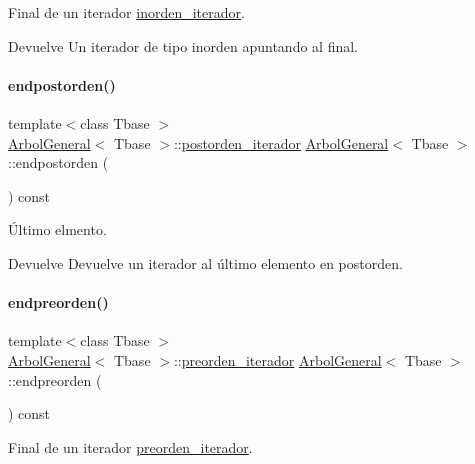 Final de un iterador \hyperlink{classArbolGeneral_1_1inorden__iterador}{inorden\+\_\+iterador}. 

\begin{DoxyReturn}{Devuelve}
Un iterador de tipo inorden apuntando al final. 
\end{DoxyReturn}
\hypertarget{classArbolGeneral_a7f63c88d6c944709d05bb753351c4be5}{}\label{classArbolGeneral_a7f63c88d6c944709d05bb753351c4be5} 
\paragraph{\texorpdfstring{endpostorden()}{endpostorden()}}
{\footnotesize\ttfamily template$<$class Tbase $>$ \\
\hyperlink{classArbolGeneral}{Arbol\+General}$<$ Tbase $>$\+::\hyperlink{classArbolGeneral_1_1postorden__iterador}{postorden\+\_\+iterador} \hyperlink{classArbolGeneral}{Arbol\+General}$<$ Tbase $>$\+::endpostorden (\begin{DoxyParamCaption}{ }\end{DoxyParamCaption}) const}



Último elmento. 

\begin{DoxyReturn}{Devuelve}
Devuelve un iterador al último elemento en postorden. 
\end{DoxyReturn}
\hypertarget{classArbolGeneral_a274d347915b21304bdd2b1014c9d0e47}{}\label{classArbolGeneral_a274d347915b21304bdd2b1014c9d0e47} 
\paragraph{\texorpdfstring{endpreorden()}{endpreorden()}}
{\footnotesize\ttfamily template$<$class Tbase $>$ \\
\hyperlink{classArbolGeneral}{Arbol\+General}$<$ Tbase $>$\+::\hyperlink{classArbolGeneral_1_1preorden__iterador}{preorden\+\_\+iterador} \hyperlink{classArbolGeneral}{Arbol\+General}$<$ Tbase $>$\+::endpreorden (\begin{DoxyParamCaption}{ }\end{DoxyParamCaption}) const}



Final de un iterador \hyperlink{classArbolGeneral_1_1preorden__iterador}{preorden\+\_\+iterador}. 

